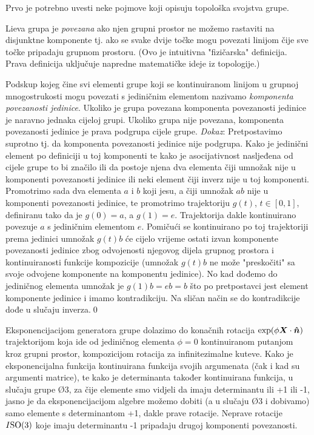Prvo je potrebno uvesti neke pojmove koji opisuju topološka
svojstva grupe.
\begin{definicija}[Povezanost]
Lieva grupa je \emph{povezana} ako njen grupni prostor ne možemo
rastaviti na disjunktne komponente tj. ako se svake dvije točke 
mogu povezati linijom čije sve točke pripadaju grupnom prostoru.
(Ovo je intuitivna "fizičarska" definicija. Prava definicija uključuje napredne
matematičke ideje iz topologije.)
\label{def:povezanost}
\end{definicija}
Podskup kojeg čine svi elementi grupe koji se
kontinuiranom linijom u grupnoj mnogostrukosti mogu povezati s
jediničnim elementom nazivamo \emph{komponenta povezanosti jedinice}.
Ukoliko je grupa povezana komponenta povezanosti jedinice je naravno
jednaka cijeloj grupi. Ukoliko grupa nije povezana, komponenta povezanosti
jedinice je prava podgrupa cijele grupe. \emph{Dokaz}: Pretpostavimo
suprotno tj. da komponenta povezanosti jedinice nije podgrupa. Kako je
jedinični element po definiciji u toj komponenti te kako je asocijativnost
nasljeđena od cijele grupe to bi značilo ili da postoje njena dva elementa čiji
umnožak nije u komponenti povezanosti jedinice ili neki element čiji inverz nije u 
toj komponenti.
Promotrimo sada dva elementa $a$ i $b$ koji jesu, a čiji umnožak $ab$ nije u komponenti
povezanosti jedinice, te promotrimo trajektoriju $g(t)$, $t\in[0,1]$,
definiranu tako da je $g(0)=a$, a $g(1)=e$. Trajektorija dakle
kontinuirano povezuje $a$ s jediničnim elementom $e$.
Pomičući se kontinuirano po toj trajektoriji prema jedinici
umnožak $g(t)b$ će cijelo vrijeme ostati izvan komponente povezanosti jedinice
zbog odvojenosti njegovog dijela grupnog prostora i kontinuiranosti
funkcije kompozicije (umnožak $g(t)b$ ne može "preskočiti" sa svoje odvojene
komponente na komponentu jedinice). No kad dođemo do jediničnog elementa
umnožak je $g(1)b = eb = b$ što po pretpostavci jest element komponente jedinice
i imamo kontradikciju. Na sličan način se do kontradikcije dođe u slučaju inverza.\qed

Eksponencijacijom generatora grupe  dolazimo do konačnih rotacija
$\exp(\phi \vec{X}\cdot\unitn)$ trajektorijom koja ide od jediničnog
elementa $\phi=0$ kontinuiranom putanjom kroz grupni prostor, kompozicijom rotacija za
infinitezimalne kuteve. Kako je eksponencijalna funkcija kontinuirana
funkcija svojih argumenata (čak i kad su argumenti matrice), te kako
je determinanta također kontinuirana funkcija, u slučaju grupe \O{3},
za čije elemente smo vidjeli da imaju determinantu ili +1 ili -1,
jasno je da eksponencijacijom algebre možemo dobiti (a u slučaju \O{3}
i dobivamo) samo elemente s determinantom +1, dakle prave rotacije.
Neprave rotacije $I\mathrm{SO}(3)$ koje imaju determinantu -1
pripadaju drugoj komponenti povezanosti.



